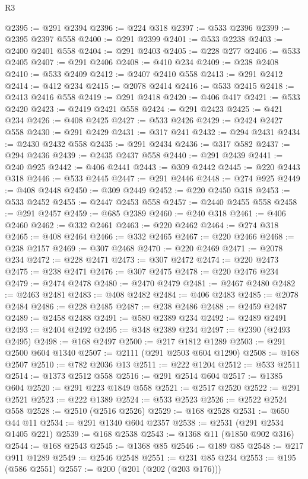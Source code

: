 \begin{lexlean}{R3}
\begin{coremodule}
@2395 := @291 @2394
@2396 := @224 @318
@2397 := @533 @2396
@2399 := @2395 @2397 @558
@2400 := @291 @2399
@2401 := @533 @2238
@2403 := @2400 @2401 @558
@2404 := @291 @2403
@2405 := @228 @277
@2406 := @533 @2405
@2407 := @291 @2406
@2408 := @410 @234
@2409 := @238 @2408
@2410 := @533 @2409
@2412 := @2407 @2410 @558
@2413 := @291 @2412
@2414 := @412 @234
@2415 := @2078 @2414
@2416 := @533 @2415
@2418 := @2413 @2416 @558
@2419 := @291 @2418
@2420 := @406 @417
@2421 := @533 @2420
@2423 := @2419 @2421 @558
@2424 := @291 @2423
@2425 := @421 @234
@2426 := @408 @2425
@2427 := @533 @2426
@2429 := @2424 @2427 @558
@2430 := @291 @2429
@2431 := @317 @241
@2432 := @294 @2431
@2434 := @2430 @2432 @558
@2435 := @291 @2434
@2436 := @317 @582
@2437 := @294 @2436
@2439 := @2435 @2437 @558
@2440 := @291 @2439
@2441 := @240 @925
@2442 := @406 @2441
@2443 := @309 @2442
@2445 := @220 @2443 @318
@2446 := @533 @2445
@2447 := @291 @2446
@2448 := @274 @925
@2449 := @408 @2448
@2450 := @309 @2449
@2452 := @220 @2450 @318
@2453 := @533 @2452
@2455 := @2447 @2453 @558
@2457 := @2440 @2455 @558
@2458 := @291 @2457
@2459 := @685 @2389
@2460 := @240 @318
@2461 := @406 @2460
@2462 := @332 @2461
@2463 := @220 @2462
@2464 := @274 @318
@2465 := @408 @2464
@2466 := @332 @2465
@2467 := @220 @2466
@2468 := @238 @2157
@2469 := @307 @2468
@2470 := @220 @2469
@2471 := @2078 @234
@2472 := @228 @2471
@2473 := @307 @2472
@2474 := @220 @2473
@2475 := @238 @2471
@2476 := @307 @2475
@2478 := @220 @2476 @234
@2479 := @2474 @2478
@2480 := @2470 @2479
@2481 := @2467 @2480
@2482 := @2463 @2481
@2483 := @408 @2482
@2484 := @406 @2483
@2485 := @2078 @2484
@2486 := @228 @2485
@2487 := @238 @2486
@2488 := @2459 @2487
@2489 := @2458 @2488
@2491 := @580 @2389 @234
@2492 := @2489 @2491
@2493 := @2404 @2492
@2495 := @348 @2389 @234
@2497 := @2390 (@2493 @2495)
@2498 := @168 @2497
@2500 := @217 @1812 @1289
@2503 := @291 @2500 @604 @1340
@2507 := @2111 (@291 @2503 @604 @1290)
@2508 := @168 @2507
@2510 := @782 @2036 @13
@2511 := @222 @1204
@2512 := @533 @2511
@2514 := @1373 @2512 @558
@2516 := @291 @2514 @604
@2517 := @1385 @604
@2520 := @291 @223 @1849 @558
@2521 := @2517 @2520
@2522 := @291 @2521
@2523 := @222 @1389
@2524 := @533 @2523
@2526 := @2522 @2524 @558
@2528 := @2510 (@2516 @2526)
@2529 := @168 @2528
@2531 := @650 @44 @11
@2534 := @291 @1340 @604 @2357
@2538 := @2531 (@291 @2534 @1405 @221)
@2539 := @168 @2538
@2543 := @1368 @11 (@1850 @902 @316)
@2544 := @168 @2543
@2545 := @1368 @85
@2546 := @189 @85
@2548 := @217 @911 @1289
@2549 := @2546 @2548
@2551 := @231 @85 @234
@2553 := @195 (@586 @2551)
@2557 := @200 (@201 (@202 (@203 @176)))

\end{coremodule}
\end{lexlean}
